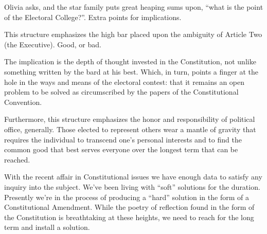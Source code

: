 

Olivia asks, and the star family puts great heaping sums upon, ``what
is the point of the Electoral College?''.  Extra points for
implications.


This structure emphasizes the high bar placed upon the ambiguity of
Article Two (the Executive).  Good, or bad.

The implication is the depth of thought invested in the Constitution,
not unlike something written by the bard at his best.  Which, in turn,
points a finger at the hole in the ways and means of the electoral
contest: that it remains an open problem to be solved as circumscribed
by the papers of the Constitutional Convention.

Furthermore, this structure emphasizes the honor and responsibility of
political office, generally.  Those elected to represent others wear a
mantle of gravity that requires the individual to transcend one's
personal interests and to find the common good that best serves
everyone over the longest term that can be reached.

With the recent affair in Constitutional issues we have enough data to
satisfy any inquiry into the subject.  We've been living with ``soft''
solutions for the duration.  Presently we're in the process of
producing a ``hard'' solution in the form of a Constitutional
Amendment.  While the poetry of reflection found in the form of the
Constitution is breathtaking at these heights, we need to reach for
the long term and install a solution.

\bye
